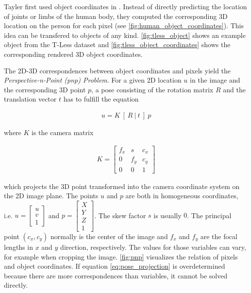 Tayler \etal first used object coordinates in \cite{tsharp}. Instead of directly predicting the location of joints or limbs of the human body, they computed the corresponding 3D location on the person for each pixel (see \fig \ref{fig:human_object_coordinates}). This idea can be transfered to objects of any kind. \fig \ref{fig:tless_object} shows an example object from the T-Less dataset \cite{tless} and \fig \ref{fig:tless_object_coordinates} shows the corresponding rendered 3D object coordinates.

The 2D-3D correspondences between object coordinates and pixels yield the \textit{Perspective-n-Point (\gls{pnp}) Problem}. For a given 2D location $u$ in the image and the corresponding 3D point $p$, a pose consisting of the rotation matrix $R$ and the translation vector $t$ has to fulfill the equation

\begin{align}
 u = K \ [ \ R \ | \ t \ ] \ p \label{eq:pose_projection}
\end{align} 
 
\noindent where $K$ is the camera matrix

\begin{align}
K = \begin{bmatrix}
f_x & s & c_x \\
0 & f_y & c_y \\
0 & 0 & 1 
\end{bmatrix}
\end{align}

\noindent which projects the 3D point transformed into the camera coordinate system on the 2D image plane. The points $u$ and $p$ are both in homogeneous coordinates, i.e. $u = \begin{bmatrix} u \\ v \\ 1 \end{bmatrix}$ and $p = \begin{bmatrix} X \\ Y \\ Z \\ 1 \end{bmatrix}$. The skew factor $s$ is usually $0$. The principal point $(c_x, c_y)$ normally is the center of the image and $f_x$ and $f_y$ are the focal lengths in $x$ and $y$ direction, respectively. The values for those variables can vary, for example when cropping the image. \fig \ref{fig:pnp} visualizes the relation of pixels and object coordinates. If equation \ref{eq:pose_projection} is overdetermined because there are more correspondences than variables, it cannot be solved directly.

